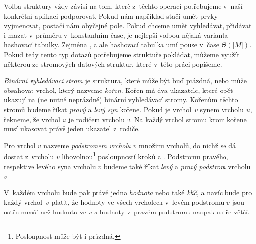 Volba struktury vždy závisí na tom, které z~těchto
operací potřebujeme v~naší konkrétní aplikaci podporovat. Pokud nám například
stačí umět prvky vyjmenovat, postačí nám obyčejné pole. Pokud chceme umět
vyhledávat, přidávat i mazat v~průměru v~konstantním čase, je nejlepší volbou nějaká
varianta hashovací tabulky. Zejména ,  a  ale hashovací
tabulka umí pouze v~čase $\Theta(|M|)$. Pokud tedy tento typ dotazů potřebujeme
struktuře pokládat, můžeme využít některou ze stromových datových struktur,
které v~této práci popíšeme.

\begin{definice}

\emph{Binární vyhledávací strom} je struktura, které může být buď prázdná, nebo
může obsahovat vrchol, který nazveme \emph{kořen}. Kořen má dva ukazatele,
které opět ukazují na (ne nutně neprázdné) binární vyhledávací stromy. Kořenům
těchto stromů budeme říkat \emph{pravý} a \emph{levý syn} kořene. Pokud je
vrchol~$v$ synem vrcholu $u$, řekneme, že vrchol $u$ je rodičem vrcholu $v$. Na
každý vrchol stromu krom kořene musí ukazovat právě jeden ukazatel z~rodiče. 

Pro vrchol $v$ nazveme
\emph{podstromem vrcholu $v$} množinu vrcholů, do nichž se dá dostat z~vrcholu
$v$ libovolnou\footnote{Posloupnost může být i prázdná.} posloupností kroků 
 a . Podstromu pravého, respektive levého syna vrcholu $v$ budeme také říkat \emph{levý} a \emph{pravý podstrom} vrcholu $v$

V~každém vrcholu bude pak právě jedna \emph{hodnota} nebo také \emph{klíč}, a navíc bude pro každý vrchol~$v$ platit, že hodnoty ve všech vrcholech v~levém podstromu $v$ jsou ostře menší než hodnota ve $v$ a hodnoty v~pravém podstromu naopak ostře větší.
\end{definice}

